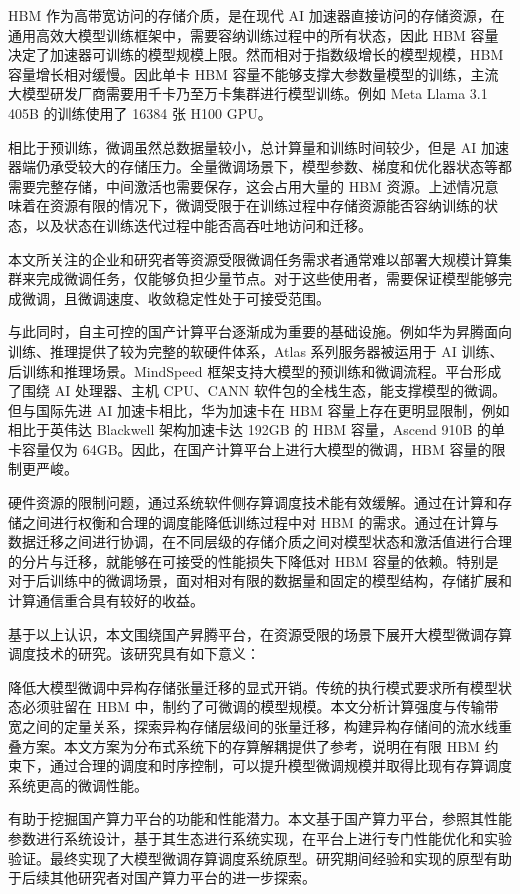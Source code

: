 \documentclass[bachelor,openany,oneside,color,AutoFakeBold=true]{buaathesis}
\begin{document}
HBM 作为高带宽访问的存储介质，是在现代 AI 加速器直接访问的存储资源，在通用高效大模型训练框架中，需要容纳训练过程中的所有状态，因此 HBM 容量决定了加速器可训练的模型规模上限。然而相对于指数级增长的模型规模，HBM 容量增长相对缓慢。因此单卡 HBM 容量不能够支撑大参数量模型的训练，主流大模型研发厂商需要用千卡乃至万卡集群进行模型训练。例如 Meta Llama 3.1 405B 的训练使用了 16384 张 H100 GPU。

相比于预训练，微调虽然总数据量较小，总计算量和训练时间较少，但是 AI 加速器端仍承受较大的存储压力。全量微调场景下，模型参数、梯度和优化器状态等都需要完整存储，中间激活也需要保存，这会占用大量的 HBM 资源。上述情况意味着在资源有限的情况下，微调受限于在训练过程中存储资源能否容纳训练的状态，以及状态在训练迭代过程中能否高吞吐地访问和迁移。

本文所关注的企业和研究者等资源受限微调任务需求者通常难以部署大规模计算集群来完成微调任务，仅能够负担少量节点。对于这些使用者，需要保证模型能够完成微调，且微调速度、收敛稳定性处于可接受范围。

与此同时，自主可控的国产计算平台逐渐成为重要的基础设施。例如华为昇腾面向训练、推理提供了较为完整的软硬件体系，Atlas 系列服务器被运用于 AI 训练、后训练和推理场景。MindSpeed 框架支持大模型的预训练和微调流程。平台形成了围绕 AI 处理器、主机 CPU、CANN 软件包的全栈生态，能支撑模型的微调。但与国际先进 AI 加速卡相比，华为加速卡在 HBM 容量上存在更明显限制，例如相比于英伟达 Blackwell 架构加速卡达 192GB 的 HBM 容量，Ascend 910B 的单卡容量仅为 64GB。因此，在国产计算平台上进行大模型的微调，HBM 容量的限制更严峻。

硬件资源的限制问题，通过系统软件侧存算调度技术能有效缓解。通过在计算和存储之间进行权衡和合理的调度能降低训练过程中对 HBM 的需求。通过在计算与数据迁移之间进行协调，在不同层级的存储介质之间对模型状态和激活值进行合理的分片与迁移，就能够在可接受的性能损失下降低对 HBM 容量的依赖。特别是对于后训练中的微调场景，面对相对有限的数据量和固定的模型结构，存储扩展和计算通信重合具有较好的收益。

基于以上认识，本文围绕国产昇腾平台，在资源受限的场景下展开大模型微调存算调度技术的研究。该研究具有如下意义：

降低大模型微调中异构存储张量迁移的显式开销。传统的执行模式要求所有模型状态必须驻留在 HBM 中，制约了可微调的模型规模。本文分析计算强度与传输带宽之间的定量关系，探索异构存储层级间的张量迁移，构建异构存储间的流水线重叠方案。本文方案为分布式系统下的存算解耦提供了参考，说明在有限 HBM 约束下，通过合理的调度和时序控制，可以提升模型微调规模并取得比现有存算调度系统更高的微调性能。

有助于挖掘国产算力平台的功能和性能潜力。本文基于国产算力平台，参照其性能参数进行系统设计，基于其生态进行系统实现，在平台上进行专门性能优化和实验验证。最终实现了大模型微调存算调度系统原型。研究期间经验和实现的原型有助于后续其他研究者对国产算力平台的进一步探索。
\end{document}
